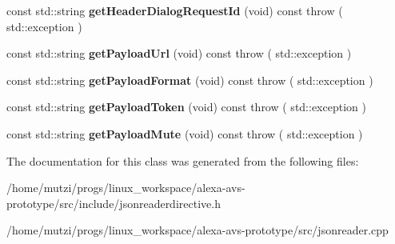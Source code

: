 \begin{DoxyCompactItemize}
const std\+::string {\bfseries get\+Header\+Dialog\+Request\+Id} (void) const  throw ( std\+::exception )
\item 
\mbox{\label{classAVSJson_1_1JsonReaderDirective_a3a39f22e2e80accfd1e556e3ce1083ee}} 
const std\+::string {\bfseries get\+Payload\+Url} (void) const  throw ( std\+::exception )
\item 
\mbox{\label{classAVSJson_1_1JsonReaderDirective_a1ce0bd1b138273a93ebf40a549f99ed8}} 
const std\+::string {\bfseries get\+Payload\+Format} (void) const  throw ( std\+::exception )
\item 
\mbox{\label{classAVSJson_1_1JsonReaderDirective_a6e79b09ca1bb989162d1129b83e29df5}} 
const std\+::string {\bfseries get\+Payload\+Token} (void) const  throw ( std\+::exception )
\item 
\mbox{\label{classAVSJson_1_1JsonReaderDirective_a2b4054afd8feba7b1c6be7011f72a9ce}} 
const std\+::string {\bfseries get\+Payload\+Mute} (void) const  throw ( std\+::exception )
\end{DoxyCompactItemize}


The documentation for this class was generated from the following files\+:\begin{DoxyCompactItemize}
\item 
/home/mutzi/progs/linux\+\_\+workspace/alexa-\/avs-\/prototype/src/include/jsonreaderdirective.\+h\item 
/home/mutzi/progs/linux\+\_\+workspace/alexa-\/avs-\/prototype/src/jsonreader.\+cpp\end{DoxyCompactItemize}
